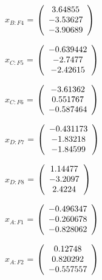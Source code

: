 \begin{description}
$x_{B:F4}$ = $\left( \begin{array} {ccc}    3.64855 \\   -3.53627 \\   -3.90689
\end{array} \right)\\ \\$

$x_{C:F5}$ = $\left( \begin{array} {ccc}  -0.639442 \\    -2.7477 \\   -2.42615
\end{array} \right)\\ \\$

$x_{C:F6}$ = $\left( \begin{array} {ccc}   -3.61362 \\   0.551767 \\  -0.587464
\end{array} \right)\\ \\$

$x_{D:F7}$ = $\left( \begin{array} {ccc}  -0.431173 \\   -1.83218 \\   -1.84599
\end{array} \right)\\ \\$

$x_{D:F8}$ = $\left( \begin{array} {ccc}    1.14477 \\    -3.2097 \\     2.4224
\end{array} \right)\\ \\$

$\hat{x}_{A:F1}$ = $\left( \begin{array} {ccc}  -0.496347 \\  -0.260678 \\  -0.828062
\end{array} \right)\\ \\$

$\hat{x}_{A:F2}$ = $\left( \begin{array} {ccc}    0.12748 \\   0.820292 \\  -0.557557
\end{array} \right)\\ \\$


\end{description}
